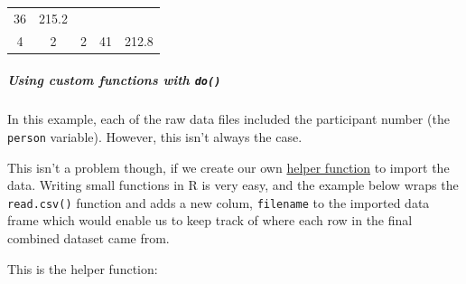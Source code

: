 \documentclass[]{article}
\newenvironment{Shaded}{\begin{snugshade}}{\end{snugshade}}
\newcommand{\KeywordTok}[1]{\textcolor[rgb]{0.13,0.29,0.53}{\textbf{#1}}}
\newcommand{\DataTypeTok}[1]{\textcolor[rgb]{0.13,0.29,0.53}{#1}}
\newcommand{\StringTok}[1]{\textcolor[rgb]{0.31,0.60,0.02}{#1}}
\newcommand{\ControlFlowTok}[1]{\textcolor[rgb]{0.13,0.29,0.53}{\textbf{#1}}}
\newcommand{\OperatorTok}[1]{\textcolor[rgb]{0.81,0.36,0.00}{\textbf{#1}}}
\newcommand{\NormalTok}[1]{#1}
\let\oldsubparagraph\subparagraph
\renewcommand{\subparagraph}[1]{\oldsubparagraph{#1}\mbox{}}
\theoremstyle{definition}
\theoremstyle{definition}
\theoremstyle{definition}
\theoremstyle{remark}
\begin{document}
\begin{longtable}[]{@{}ccccc@{}}
\begin{minipage}[t]{0.11\columnwidth}
36\strut
\end{minipage} & \begin{minipage}[t]{0.11\columnwidth}\centering\strut
215.2\strut
\end{minipage}\tabularnewline
\begin{minipage}[t]{0.14\columnwidth}\centering\strut
4\strut
\end{minipage} & \begin{minipage}[t]{0.10\columnwidth}\centering\strut
2\strut
\end{minipage} & \begin{minipage}[t]{0.08\columnwidth}\centering\strut
2\strut
\end{minipage} & \begin{minipage}[t]{0.11\columnwidth}\centering\strut
41\strut
\end{minipage} & \begin{minipage}[t]{0.11\columnwidth}\centering\strut
212.8\strut
\end{minipage}\tabularnewline
\bottomrule
\end{longtable}

\subparagraph{\texorpdfstring{Using custom functions with
\texttt{do()}}{Using custom functions with do()}}\label{using-custom-functions-with-do}

In this example, each of the raw data files included the participant
number (the \texttt{person} variable). However, this isn't always the
case.

This isn't a problem though, if we create our own
\protect\hyperlink{helper-functions}{helper function} to import the
data. Writing small functions in R is very easy, and the example below
wraps the \texttt{read.csv()} function and adds a new colum,
\texttt{filename} to the imported data frame which would enable us to
keep track of where each row in the final combined dataset came from.

This is the helper function:

\begin{Shaded}
\end{Shaded}
\end{document}
